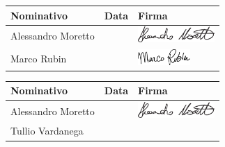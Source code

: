 	
\begin{center}
	\begin{tabu} to \textwidth {|X[4]|X[2c]|X[5]|}
	\hline
     Nominativo & Data & Firma \\ \hline
     Alessandro Moretto & & \includegraphics[height=6mm]{Commons/Pics/Signatures/Moretto.pdf}\\ \hline
     Marco Rubin & &\includegraphics[height=6mm]{Commons/Pics/Signatures/Rubin.pdf} \\ \hline
     \end{tabu}
	\end{center}
	\begin{center}
	\begin{tabu} to \textwidth {|X[4]|X[2c]|X[5]|}
	\hline
     Nominativo & Data & Firma \\ \hline
     Alessandro Moretto & & \includegraphics[height=6mm]{Commons/Pics/Signatures/Moretto.pdf}\\ \hline
     Tullio Vardanega & & \parbox[b]{1cm}{\vspace{6mm}}\\ \hline
     \end{tabu}
	\end{center}
